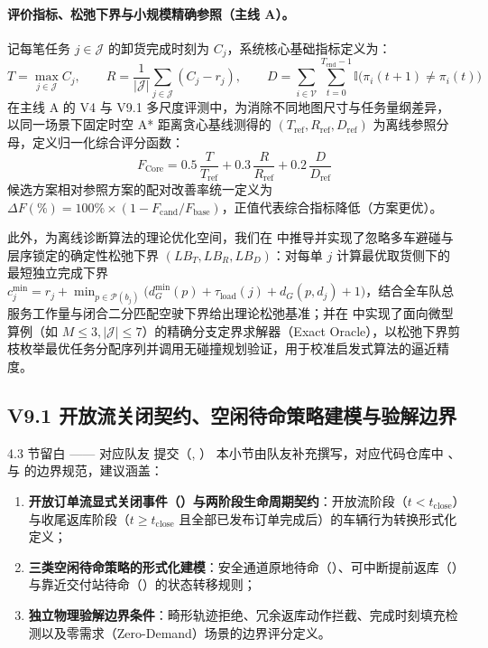 \paragraph{评价指标、松弛下界与小规模精确参照（主线 A）。} 记每笔任务 $j \in \mathcal{J}$ 的卸货完成时刻为 $C_j$，系统核心基础指标定义为：
\begin{equation}
  T = \max_{j \in \mathcal{J}} C_j, \qquad
  R = \frac{1}{|\mathcal{J}|}\sum_{j \in \mathcal{J}} (C_j - r_j), \qquad
  D = \sum_{i \in \mathcal{V}} \sum_{t=0}^{T_{\text{end}}-1} \mathbb{I}\big(\pi_i(t+1) \neq \pi_i(t)\big)
  \label{eq:trd-def}
\end{equation}
在主线 A 的 V4 与 V9.1 多尺度评测中，为消除不同地图尺寸与任务量纲差异，以同一场景下固定时空 A* 距离贪心基线测得的 $(T_{\mathrm{ref}}, R_{\mathrm{ref}}, D_{\mathrm{ref}})$ 为离线参照分母，定义归一化综合评分函数：
\begin{equation}
  F_{\text{Core}} = 0.5\,\frac{T}{T_{\mathrm{ref}}} + 0.3\,\frac{R}{R_{\mathrm{ref}}} + 0.2\,\frac{D}{D_{\mathrm{ref}}}
  \label{eq:f-core}
\end{equation}
候选方案相对参照方案的配对改善率统一定义为 $\Delta F (\%) = 100\% \times (1 - F_{\text{cand}} / F_{\text{base}})$，正值代表综合指标降低（方案更优）。

此外，为离线诊断算法的理论优化空间，我们在  中推导并实现了忽略多车避碰与层序锁定的确定性松弛下界 $(LB_T, LB_R, LB_D)$：对每单 $j$ 计算最优取货侧下的最短独立完成下界 $c_j^{\min} = r_j + \min_{p \in \mathcal{P}(b_j)}\big(d_G^{\min}(p) + \tau_{\text{load}}(j) + d_G(p, d_j) + 1\big)$，结合全车队总服务工作量与闭合二分匹配空驶下界给出理论松弛基准；并在  中实现了面向微型算例（如 $M \le 3, |\mathcal{J}| \le 7$）的精确分支定界求解器（Exact Oracle），以松弛下界剪枝枚举最优任务分配序列并调用无碰撞规划验证，用于校准启发式算法的逼近精度。

\subsection{V9.1 开放流关闭契约、空闲待命策略建模与验解边界}

\begin{teammatebox}{4.3 节留白 —— 对应队友  提交（, ）}
  本小节由队友补充撰写，对应代码仓库中 、 与  的边界规范，建议涵盖：
  \begin{enumerate}
    \item \textbf{开放订单流显式关闭事件（）与两阶段生命周期契约}：开放流阶段（$t < t_{\text{close}}$）与收尾返库阶段（$t \ge t_{\text{close}}$ 且全部已发布订单完成后）的车辆行为转换形式化定义；
    \item \textbf{三类空闲待命策略的形式化建模}：安全通道原地待命（）、可中断提前返库（）与靠近交付站待命（）的状态转移规则；
    \item \textbf{独立物理验解边界条件}：畸形轨迹拒绝、冗余返库动作拦截、完成时刻填充检测以及零需求（Zero-Demand）场景的边界评分定义。
  \end{enumerate}
\end{teammatebox}

